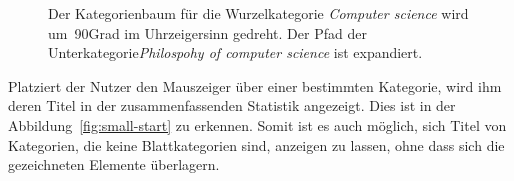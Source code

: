 \begin{figure}
    \caption{Der Kategorienbaum für die Wurzelkategorie \emph{Computer science} wird um~90\textdegree Grad im Uhrzeigersinn gedreht. Der Pfad der Unterkategorie\emph{Philospohy of computer science} ist expandiert.}
    \label{fig:rotation-tree}
\end{figure}

Platziert der Nutzer den Mauszeiger über einer bestimmten Kategorie, wird ihm deren Titel in der zusammenfassenden Statistik angezeigt. Dies ist in der Abbildung~\ref{fig:small-start} zu erkennen.
Somit ist es auch möglich, sich Titel von Kategorien, die keine Blattkategorien sind, anzeigen zu lassen, ohne dass sich die gezeichneten Elemente überlagern.

